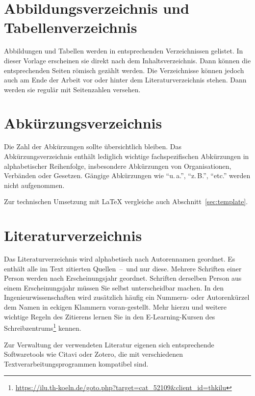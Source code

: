\section{Abbildungsverzeichnis und Tabellenverzeichnis}
Abbildungen und Tabellen werden in entsprechenden Verzeichnissen gelistet. In dieser Vorlage erscheinen sie direkt nach dem Inhaltsverzeichnis. Dann können die entsprechenden Seiten römisch gezählt werden. Die Verzeichnisse können jedoch auch am Ende der Arbeit vor oder hinter dem Literaturverzeichnis stehen. Dann werden sie regulär mit Seitenzahlen versehen.
%
%
\section{Abkürzungsverzeichnis}
Die Zahl der Abkürzungen sollte übersichtlich bleiben. Das Abkürzungsverzeichnis enthält lediglich wichtige fachspezifischen Abkürzungen in alphabetischer Reihenfolge, insbesondere Abkürzungen von Organisationen, Verbänden oder Gesetzen. Gängige Abkürzungen wie \enquote{u.\,a.}, \enquote{z.\,B.}, \enquote{etc.} werden nicht aufgenommen.
\par
Zur technischen Umsetzung mit \LaTeX{} vergleiche auch Abschnitt~\ref{sec:template}.
%
%
\section{Literaturverzeichnis}
Das Literaturverzeichnis wird alphabetisch nach Autorennamen geordnet. Es enthält alle im Text zitierten Quellen~--~und nur diese. Mehrere Schriften einer Person werden nach Erscheinungsjahr geordnet. Schriften derselben Person aus einem Erscheinungsjahr müssen Sie selbst unterscheidbar machen. In den Ingenieurwissenschaften wird zusätzlich häufig ein Nummern- oder Autorenkürzel dem Namen in eckigen Klammern voran-gestellt. Mehr hierzu und weitere wichtige Regeln des Zitierens lernen Sie in den E-Learning-Kursen des Schreibzentrums\footnote{\href{https://ilu.th-koeln.de/goto.php?target=cat\_52109\&client\_id=thkilu}{https://ilu.th-koeln.de/goto.php?target=cat\_52109\&client\_id=thkilu}} kennen.
\par
Zur Verwaltung der verwendeten Literatur eigenen sich entsprechende Softwaretools wie Citavi oder Zotero, die mit verschiedenen Textverarbeitungsprogrammen kompatibel sind.
%
%
